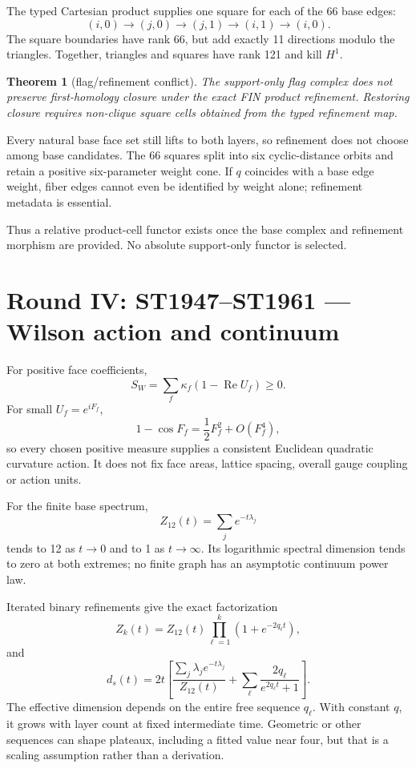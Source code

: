 \documentclass[11pt,a4paper]{article}
\newtheorem{theorem}{Theorem}\newcommand{\status}[1]{\textsf{[#1]}}
\begin{document}
The typed Cartesian product supplies one square for each of the 66 base edges:
\[
(i,0)\to(j,0)\to(j,1)\to(i,1)\to(i,0).
\]
The square boundaries have rank 66, but add exactly 11 directions modulo the
triangles.  Together, triangles and squares have rank 121 and kill $H^1$.

\begin{theorem}[flag/refinement conflict]
The support-only flag complex does not preserve first-homology closure under the
exact FIN product refinement.  Restoring closure requires non-clique square
cells obtained from the typed refinement map.
\end{theorem}

Every natural base face set still lifts to both layers, so refinement does not
choose among base candidates.  The 66 squares split into six cyclic-distance
orbits and retain a positive six-parameter weight cone.  If $q$ coincides with
a base edge weight, fiber edges cannot even be identified by weight alone;
refinement metadata is essential.

Thus a relative product-cell functor exists once the base complex and
refinement morphism are provided.  No absolute support-only functor is selected.

\section{Round IV: ST1947--ST1961 --- Wilson action and continuum}

For positive face coefficients,
\[
S_W=\sum_f\kappa_f(1-\operatorname{Re}U_f)\ge0.
\]
For small $U_f=e^{iF_f}$,
\[
1-\cos F_f=\frac12F_f^2+O(F_f^4),
\]
so every chosen positive measure supplies a consistent Euclidean quadratic
curvature action.  It does not fix face areas, lattice spacing, overall gauge
coupling or action units.

For the finite base spectrum,
\[
Z_{12}(t)=\sum_j e^{-t\lambda_j}
\]
tends to 12 as $t\to0$ and to 1 as $t\to\infty$.  Its logarithmic spectral
dimension tends to zero at both extremes; no finite graph has an asymptotic
continuum power law.

Iterated binary refinements give the exact factorization
\[
Z_k(t)=Z_{12}(t)\prod_{\ell=1}^k(1+e^{-2q_\ell t}),
\]
and
\[
d_s(t)=2t\left[
\frac{\sum_j\lambda_je^{-t\lambda_j}}{Z_{12}(t)}
+\sum_\ell\frac{2q_\ell}{e^{2q_\ell t}+1}
\right].
\]
The effective dimension depends on the entire free sequence $q_\ell$.  With
constant $q$, it grows with layer count at fixed intermediate time.  Geometric
or other sequences can shape plateaux, including a fitted value near four, but
that is a scaling assumption rather than a derivation.
\end{document}
